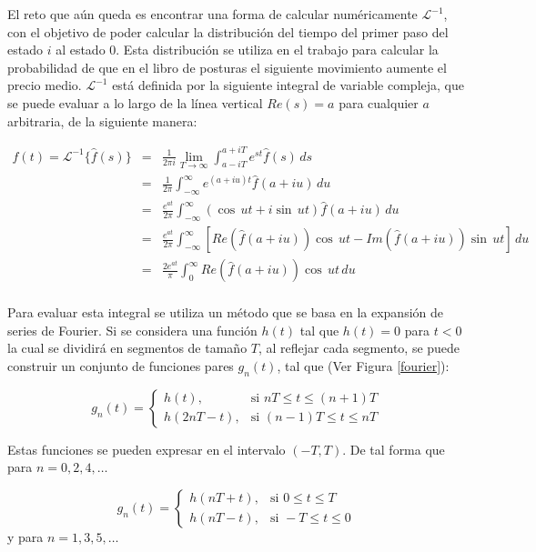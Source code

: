 \documentclass[11pt]{article}
\numberwithin{equation}{section} %
\begin{document}
El reto que aún queda es encontrar una forma de calcular numéricamente $\mathcal{L}^{-1}$, con el objetivo de poder calcular la distribución del tiempo del primer paso del estado $i$ al estado 0. Esta distribución se utiliza en el trabajo para calcular la probabilidad de que en el libro de posturas el siguiente movimiento aumente el precio medio. $\mathcal{L}^{-1}$ está definida por la siguiente integral de variable compleja, que se puede evaluar a lo largo de la línea vertical $Re(s)=a$ para cualquier $a$ arbitraria, de la siguiente manera:

\[
\begin{array}{rcl}
f(t) = \mathcal{L}^{-1} \{\hat{f}(s)\} & = & \displaystyle \frac{1}{2 \pi i} \lim_{T\to\infty}\int_{ a - i T}^{ a + i T} e^{st} \hat{f}(s)\,ds\\
& = & \displaystyle \frac{1}{2 \pi} \int_{ -\infty}^{ \infty} e^{(a+iu)t} \hat{f}(a+iu)\,du\\
& = & \displaystyle \frac{e^{at}}{2 \pi} \int_{ -\infty}^{ \infty} (\cos\,ut + i \sin\,ut)\hat{f}(a+iu)\,du\\
& = & \displaystyle \frac{e^{at}}{2 \pi} \int_{ -\infty}^{ \infty} \left[Re(\hat{f}(a+iu))\cos\,ut - Im(\hat{f}(a+iu))\sin\,ut\right]\,du\\
& = & \displaystyle \frac{2e^{at}}{\pi} \int_{0}^{ \infty} Re(\hat{f}(a+iu))\cos\,ut\,du\\
\end{array}
\]

Para evaluar esta integral se utiliza un método \cite{dubner1968} que se basa en la expansión de series de Fourier. Si se considera una función $h(t)$ tal que $h(t)=0$ para $t<0$ la cual se dividirá en segmentos de tamaño $T$, al reflejar cada segmento, se puede construir un conjunto de funciones pares $g_n(t)$, tal que (Ver Figura \ref{fourier}):

\[
g_n(t) =
\begin{cases}
h(t), & \mbox{si } nT\leq t \leq (n+1)T \\
h(2nT-t), & \mbox{si } (n-1)T \leq t \leq nT
\end{cases}
\]

Estas funciones se pueden expresar en el intervalo $(-T,T)$. De tal forma que para $n=0,2,4,\ldots$

\[
g_n(t) =
\begin{cases}
h(nT+t), & \mbox{si } 0 \leq t \leq T \\
h(nT-t), & \mbox{si } -T \leq t \leq 0
\end{cases}
\]
y para $n=1,3,5,\ldots$
\end{document}

